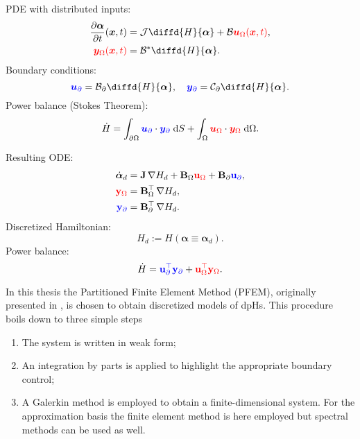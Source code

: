 \begin{tcbraster}[raster columns=2, raster equal height]
	\begin{tcolorbox}[width=0.4\textwidth, nobeforeafter, colframe=theme,title=Infinite dimensional pH system]%
		PDE with distributed inputs:
		\begin{align*}
		\diffp{\bm{\alpha}}{t}(\bm{x}, t) &= \mathcal{J} {\displaystyle \diffd{H}{\bm{\alpha}}}+ \mathcal{B} \textcolor{red}{\bm{u}_\Omega(\bm{x}, t)}, \\
		\textcolor{red}{\bm{y}_\Omega(\bm{x}, t)} &= \mathcal{B}^* {\displaystyle \diffd{H}{\bm{\alpha}}}.
		\end{align*}
		Boundary conditions: 
		\[\textcolor{blue}{\bm{u}_\partial} = \mathcal{B}_\partial{\displaystyle \diffd{H}{\bm{\alpha}}}, \quad \textcolor{blue}{\bm{y}_\partial} = \mathcal{C}_\partial {\displaystyle \diffd{H}{\bm{\alpha}}}. \]
		Power balance (Stokes Theorem): 
		\[ \dot{H} = \displaystyle \int_{\partial \Omega} \textcolor{blue}{\bm{u}_\partial} \cdot \textcolor{blue}{\bm{y}_\partial} \d{S} +  \int_{\Omega} \textcolor{red}{\bm{u}_\Omega} \cdot \textcolor{red}{\bm{y}_\Omega} \d{\Omega}.
		\]
	\end{tcolorbox} 
	\begin{tcolorbox}[width=0.4\textwidth, nobeforeafter,  colframe=theme,title=Structure-preserving discretization]%
		Resulting ODE:
		\begin{align*}
		\dot{\bm{\alpha}}_d &= \mathbf{J} \, {\nabla {H}_d} + \mathbf{B}_\Omega \textcolor{red}{\mathbf{u}_\Omega} + \mathbf{B}_\partial \textcolor{blue}{\mathbf{u}_\partial}, \\
		\textcolor{red}{\mathbf{y}_\Omega} &= \mathbf{B}_\Omega^\top \, {\nabla {H}_d}, \\
		\textcolor{blue}{\mathbf{y}_\partial} &= \mathbf{B}_\partial^\top \,{\nabla {H}_d}.
		\end{align*}
		Discretized Hamiltonian:
		\[
		H_d := H(\bm{\alpha} \equiv \bm{\alpha}_d).
		\]
		Power balance: 
		\[ \dot{H} = \textcolor{blue}{\mathbf{u}_\partial^\top \mathbf{y}_\partial} +  \textcolor{red}{\mathbf{u}_\Omega^\top \mathbf{y}_\Omega}.
		\]
	\end{tcolorbox}
\end{tcbraster}
\vspace{.5cm}
In this thesis the Partitioned Finite Element Method (PFEM), originally presented in \cite{cardoso2018pfem,cardoso2019partitioned}, is chosen to obtain discretized models of dpHs. This procedure boils down to three simple steps
\begin{enumerate}
	\item The system is written in weak form; 
	\item An integration by parts is applied to highlight the appropriate boundary control;
	\item A Galerkin method is employed to obtain a finite-dimensional system. For the approximation basis the finite element method is here employed but spectral methods can be used as well.
\end{enumerate}


